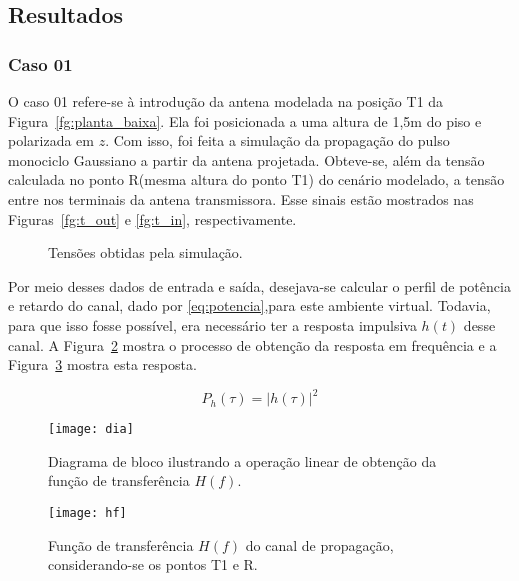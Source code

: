 \subsection{Resultados}
\subsubsection{Caso 01}
	O caso 01 refere-se à introdução da antena modelada na posição T1 da Figura~\ref{fg:planta_baixa}. Ela foi posicionada a uma altura de 1,5m do piso e polarizada em $z$. Com isso, foi feita a simulação da propagação do pulso monociclo Gaussiano a partir da antena projetada. Obteve-se, além da tensão calculada no ponto R(mesma altura do ponto T1) do cenário modelado, a tensão entre nos terminais da antena transmissora. Esse sinais estão mostrados nas Figuras~\ref{fg:t_out} e \ref{fg:t_in}, respectivamente.

\begin{figure}[!ht]
	\begin{center}
\qquad
	\end{center}
	\caption{Tensões obtidas pela simulação.}
	\label{fg:tensoes}
\end{figure}

	Por meio desses dados de entrada e saída, desejava-se calcular o perfil de potência e retardo do canal, dado por \ref{eq:potencia},para este ambiente virtual. Todavia, para que isso fosse possível, era necessário ter a resposta impulsiva $h(t)$ desse canal. A Figura~\ref{fg:dia} mostra o processo de obtenção da resposta em frequência e a Figura~\ref{fg:hf} mostra esta resposta.

\begin{equation}\label{eq:potencia}
	P_h(\tau) = |h(\tau)|^{2}
\end{equation}
\begin{figure}[!ht]
	\centering
	\texttt{[image: dia]}
	\caption{Diagrama de bloco ilustrando a operação linear de obtenção da função de transferência $H(f)$.}
	\label{fg:dia}
\end{figure}
\begin{figure}[!ht]
	\centering
	\texttt{[image: hf]}
	\caption{Função de transferência $H(f)$ do canal de propagação, considerando-se os pontos T1 e R.}
	\label{fg:hf}
\end{figure}

